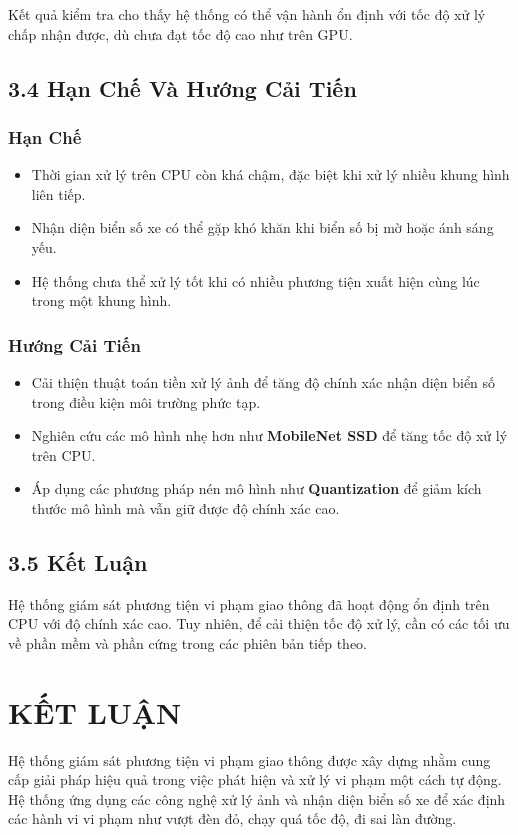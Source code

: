 \documentclass[conference]{IEEEtran}
\begin{document}
Kết quả kiểm tra cho thấy hệ thống có thể vận hành ổn định với tốc độ xử lý chấp nhận được, dù chưa đạt tốc độ cao như trên GPU.

\subsection{3.4 Hạn Chế Và Hướng Cải Tiến}
\subsubsection{Hạn Chế}
\begin{itemize}
    \item Thời gian xử lý trên CPU còn khá chậm, đặc biệt khi xử lý nhiều khung hình liên tiếp.
    \item Nhận diện biển số xe có thể gặp khó khăn khi biển số bị mờ hoặc ánh sáng yếu.
    \item Hệ thống chưa thể xử lý tốt khi có nhiều phương tiện xuất hiện cùng lúc trong một khung hình.
\end{itemize}

\subsubsection{Hướng Cải Tiến}
\begin{itemize}
    \item Cải thiện thuật toán tiền xử lý ảnh để tăng độ chính xác nhận diện biển số trong điều kiện môi trường phức tạp.
    \item Nghiên cứu các mô hình nhẹ hơn như \textbf{MobileNet SSD} để tăng tốc độ xử lý trên CPU.
    \item Áp dụng các phương pháp nén mô hình như \textbf{Quantization} để giảm kích thước mô hình mà vẫn giữ được độ chính xác cao.
\end{itemize}

\subsection{3.5 Kết Luận}
Hệ thống giám sát phương tiện vi phạm giao thông đã hoạt động ổn định trên CPU với độ chính xác cao. Tuy nhiên, để cải thiện tốc độ xử lý, cần có các tối ưu về phần mềm và phần cứng trong các phiên bản tiếp theo.

\section{KẾT LUẬN}

Hệ thống giám sát phương tiện vi phạm giao thông được xây dựng nhằm cung cấp giải pháp hiệu quả trong việc phát hiện và xử lý vi phạm một cách tự động. Hệ thống ứng dụng các công nghệ xử lý ảnh và nhận diện biển số xe để xác định các hành vi vi phạm như vượt đèn đỏ, chạy quá tốc độ, đi sai làn đường.
\end{document}
